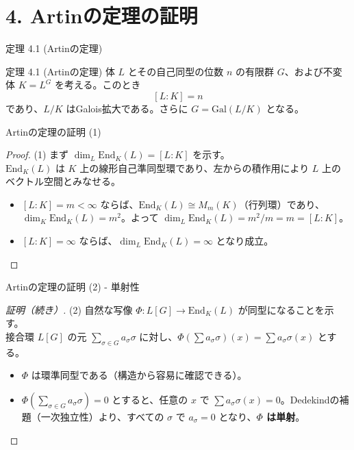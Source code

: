 \documentclass[aspectratio=169,11pt,unicode]{beamer}
\begin{document}
\section{4. Artinの定理の証明}

\begin{frame}{定理 4.1 (Artinの定理)}
\begin{block}{定理 4.1 (Artinの定理)}
体 $L$ とその自己同型の位数 $n$ の有限群 $G$、および不変体 $K = L^G$ を考える。このとき
\[ [L:K] = n \]
であり、$L/K$ はGalois拡大である。さらに $G = \mathrm{Gal}(L/K)$ となる。
\end{block}
\end{frame}

\begin{frame}{Artinの定理の証明 (1)}
\begin{proof}
(1) まず $\dim_L \mathrm{End}_K(L) = [L:K]$ を示す。\\
$\mathrm{End}_K(L)$ は $K$ 上の線形自己準同型環であり、左からの積作用により $L$ 上のベクトル空間とみなせる。
\begin{itemize}
    \item $[L:K] = m < \infty$ ならば、$\mathrm{End}_K(L) \cong M_m(K)$（行列環）であり、$\dim_K \mathrm{End}_K(L) = m^2$。よって $\dim_L \mathrm{End}_K(L) = m^2 / m = m = [L:K]$。
    \item $[L:K] = \infty$ ならば、$\dim_L \mathrm{End}_K(L) = \infty$ となり成立。
\end{itemize}
\end{proof}
\end{frame}

\begin{frame}{Artinの定理の証明 (2) - 単射性}
\begin{proof}[証明（続き）]
(2) 自然な写像 $\Phi: L[G] \to \mathrm{End}_K(L)$ が同型になることを示す。\\
接合環 $L[G]$ の元 $\sum_{\sigma \in G} a_\sigma \sigma$ に対し、$\Phi(\sum a_\sigma \sigma)(x) = \sum a_\sigma \sigma(x)$ とする。
\begin{itemize}
    \item $\Phi$ は環準同型である（構造から容易に確認できる）。
    \item $\Phi(\sum_{\sigma \in G} a_\sigma \sigma) = 0$ とすると、任意の $x$ で $\sum a_\sigma \sigma(x) = 0$。Dedekindの補題（一次独立性）より、すべての $\sigma$ で $a_\sigma = 0$ となり、\textbf{$\Phi$ は単射}。
\end{itemize}
\end{proof}
\end{frame}
\end{document}
